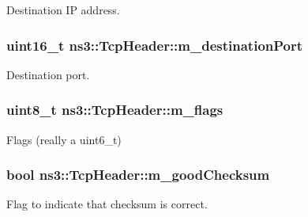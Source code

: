 Destination IP address. 

\subsubsection[{\texorpdfstring{m\+\_\+destination\+Port}{m_destinationPort}}]{\setlength{\rightskip}{0pt plus 5cm}uint16\+\_\+t ns3\+::\+Tcp\+Header\+::m\+\_\+destination\+Port\hspace{0.3cm}{\ttfamily [private]}}\hypertarget{classns3_1_1TcpHeader_aef80cfee978806b00bf64f8154bea90f}{}\label{classns3_1_1TcpHeader_aef80cfee978806b00bf64f8154bea90f}


Destination port. 

\subsubsection[{\texorpdfstring{m\+\_\+flags}{m_flags}}]{\setlength{\rightskip}{0pt plus 5cm}uint8\+\_\+t ns3\+::\+Tcp\+Header\+::m\+\_\+flags\hspace{0.3cm}{\ttfamily [private]}}\hypertarget{classns3_1_1TcpHeader_adf2f1e35446aca125ff4a66527d7974c}{}\label{classns3_1_1TcpHeader_adf2f1e35446aca125ff4a66527d7974c}


Flags (really a uint6\+\_\+t) 

\subsubsection[{\texorpdfstring{m\+\_\+good\+Checksum}{m_goodChecksum}}]{\setlength{\rightskip}{0pt plus 5cm}bool ns3\+::\+Tcp\+Header\+::m\+\_\+good\+Checksum\hspace{0.3cm}{\ttfamily [private]}}\hypertarget{classns3_1_1TcpHeader_abff3dc7bf583a246c51ffcd2055ff059}{}\label{classns3_1_1TcpHeader_abff3dc7bf583a246c51ffcd2055ff059}


Flag to indicate that checksum is correct. 

